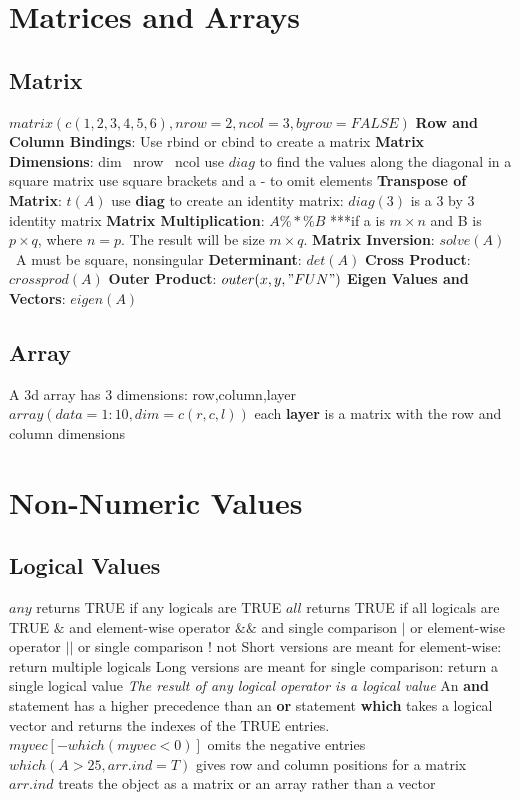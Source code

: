 \documentclass[openany]{book}
\begin{document}
\begin{flushleft}
\chapter{Matrices and Arrays}
\section{Matrix}
$matrix(c(1,2,3,4,5,6),nrow=2, ncol=3,byrow=FALSE)$ \medbreak
\textbf{Row and Column Bindings}: Use  rbind  or cbind  to create a matrix \medbreak
\textbf{Matrix Dimensions}: dim \ nrow \ ncol \medbreak
use $diag$ to find the values along the diagonal in a square matrix \medbreak
use square brackets and a - to omit elements \medbreak
\textbf{Transpose of Matrix}: $t(A)$ \medbreak
use \textbf{diag} to create an identity matrix: $diag(3)$ is a 3 by 3 identity matrix \medbreak
\textbf{Matrix Multiplication}: $A\%*\%B$ \medbreak
***if a is $m\times n$ and B is $p\times q$,  where $n=p$. The result will be size $m\times q$. \medbreak
\textbf{Matrix Inversion}: $solve(A)$ \ A must be square, nonsingular \medbreak
\textbf{Determinant}: $det(A)$\medbreak
\textbf{Cross Product}: $crossprod(A)$\medbreak
\textbf{Outer Product}: $outer(x,y,"FUN")$ \medbreak
\textbf{Eigen Values and Vectors}: $eigen(A)$
\section{Array}
A 3d array has 3 dimensions: row,column,layer \medbreak
$array(data=1:10,dim=c(r,c,l))$ \medbreak
each \textbf{layer} is a matrix with the row and column dimensions
\chapter{Non-Numeric Values}
\section{Logical Values}
$any$ returns TRUE if any logicals are TRUE \medbreak
$all$ returns TRUE if all logicals are TRUE \medbreak
$\&$ and element-wise operator \medbreak
$\&\&$ and single comparison \medbreak
$|$ or element-wise operator \medbreak
$||$ or single comparison \medbreak
$!$ not \medbreak
Short versions are meant for element-wise: return multiple logicals \medbreak
Long versions are meant for single comparison: return a single logical value \medbreak
\textit{The result of any logical operator is a logical value} \medbreak
An \textbf{and} statement has a higher precedence than an \textbf{or} statement \medbreak
\textbf{which} takes a logical vector and returns the indexes of the TRUE entries. \medskip
$myvec[-which(myvec<0)]$ omits the negative entries \medbreak
$which(A>25,arr.ind=T)$ gives row and column positions for a matrix \medbreak
$arr.ind$ treats the object as a matrix or an array rather than a vector

\end{flushleft}
\end{document}
